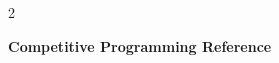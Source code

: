\documentclass[9pt,a4paper]{extarticle}
\begin{document}
\begin{multicols}{2}
\raggedcolumns

{\centering\bfseries\large Competitive Programming Reference\par}
\vspace{0.6ex}

{\small
\renewcommand{\contentsname}{\normalsize Index}
\tableofcontents}
\vspace{1ex}



%

\end{multicols}
\end{document}

